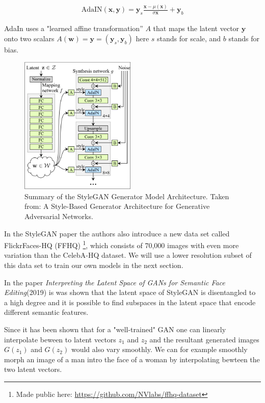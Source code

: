 \begin{align}
  \text{AdaIN}(\mathbf{x},\mathbf{y}) = \mathbf{y}_s \frac{\mathbf{x}-\mu(\mathbf{x})}{\sigma{\mathbf{x}}}+\mathbf{y}_b
\end{align}

AdaIn uses a "learned affine transformation” $A$ that maps the latent  vector $\mathbf{y}$ onto two scalars $A(\mathbf{w})= \mathbf{y}=(\mathbf{y}_s,\mathbf{y}_b)$ here $s$ stands for scale, and $b$ stands for bias.

\begin{figure}
\includegraphics[width=5.5cm]{fig/stylegan-arch}
\caption{Summary of the StyleGAN Generator Model Architecture.
Taken from: A Style-Based Generator Architecture for Generative Adversarial Networks.\cite{stylegan}}
\label{stylegan-arch}
\end{figure}


In the StyleGAN paper the authors also introduce a new data set called FlickrFaces-HQ (FFHQ) \footnote{Made public here: \url{https://github.com/NVlabs/ffhq-dataset}}, which consists of 70,000 images with even more variation than the CelebA-HQ dataset.\cite{stylegan} We will use a lower resolution subset of this data set to train our own models in the next section.  

In the paper \textit{Interpreting the Latent Space of GANs for Semantic Face Editing}(2019)\cite{interfacegan} is was shown that the latent space of StyleGAN is disentangled to a high degree and it is possible to find subspaces in the latent space that encode different semantic features.

Since it has been shown that for a "well-trained" GAN one can linearly interpolate beween to latent vectors  $z_1$ and $z_2$ and the resultant generated images $G(z_1)$ and $G(z_2)$ would also vary smoothly. We can for example smoothly morph an image of a man intro the face of a woman by interpolating bewteen the two latent vectors.   

